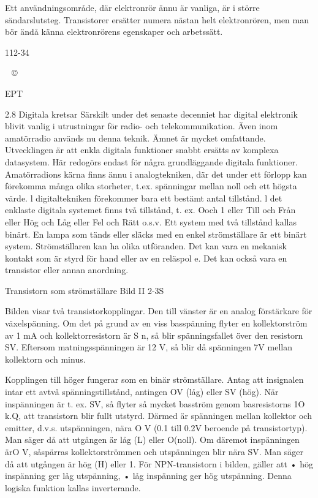 \documentclass[a4paper,twoside,twocolumn,openright]{book}
\begin{document}
{{{{Ett användningsområde, där elektronrör
ännu är vanliga, är i större sändarslutsteg.
Transistorer ersätter numera nästan helt
elektronrören, men man bör ändå känna
elektronrörens egenskaper och arbetssätt.

112-34

~©~

EPT

2.8 Digitala kretsar
Särskilt under det senaste decenniet har
digital elektronik blivit vanlig i utrustningar
för radio- och telekommunikation. Även inom
amatörradio används nu denna teknik. Ämnet är mycket omfattande. Utvecklingen är
att enkla digitala funktioner snabbt ersätts av
komplexa datasystem. Här redogörs endast
för några grundläggande digitala funktioner.
Amatörradions kärna finns ännu i analogtekniken, där det under ett förlopp kan förekomma många olika storheter, t.ex. spänningar mellan noll och ett högsta värde.
l digitaltekniken förekommer bara ett bestämt antal tillstånd. l det enklaste digitala
systemet finns två tillstånd, t. ex. Ooch 1 eller
Till och Från eller Hög och Låg eller Fel och
Rätt o.s.v. Ett system med två tillstånd kallas
binärt. En lampa som tänds eller släcks med
en enkel strömställare är ett binärt system.
Strömställaren kan ha olika utföranden. Det
kan vara en mekanisk kontakt som är styrd
för hand eller av en reläspol e. Det kan också
vara en transistor eller annan anordning.

Transistorn som strömställare
Bild II 2-3S

Bilden visar två transistorkopplingar. Den till
vänster är en analog förstärkare för växelspänning. Om det på grund av en viss basspänning flyter en kollektorström av 1 mA
och kollektorresistorn är S n, så blir spänningsfallet över den resistorn SV. Eftersom
matningsspänningen är 12 V, så blir då
spänningen 7V mellan kollektorn och minus.

Kopplingen till höger fungerar som en
binär strömställare. Antag att insignalen intar ett avtvå spänningstillstånd, antingen OV
(låg) eller SV (hög). När inspänningen är
t. ex. SV, så flyter så mycket basström genom
basresistorns 1O k.Q, att transistorn blir fullt
utstyrd.
Därmed är spänningen mellan kollektor
och emitter, d.v.s. utspänningen, nära O V
(0.1 till 0.2V beroende på transistortyp). Man
säger då att utgången är låg (L) eller O(noll).
Om däremot inspänningen ärO V, såspärras kollektorströmmen och utspänningen blir
nära SV. Man säger då att utgången är hög
(H) eller 1.
För NPN-transistorn i bilden, gäller att
• hög inspänning ger låg utspänning,
• låg inspänning ger hög utspänning.
Denna logiska funktion kallas inverterande.

}}}}
\end{document}
